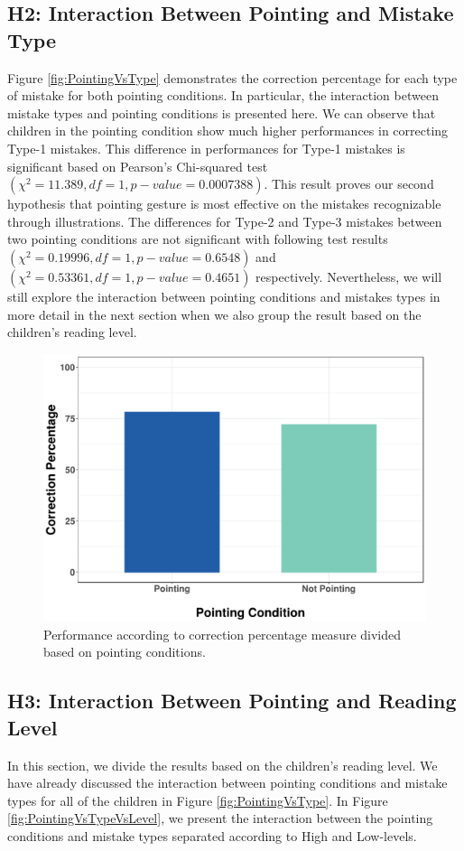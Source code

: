 \documentclass{sigchi}
\begin{document}
\subsection{H2: Interaction Between Pointing and Mistake Type}
Figure \ref{fig:PointingVsType} demonstrates the correction percentage for each type of mistake for both pointing conditions. 
In particular, the interaction between mistake types and pointing conditions is presented here. 
We can observe that children in the pointing condition show much higher performances in correcting Type-1 mistakes.
This difference in performances for Type-1 mistakes is significant based on Pearson's Chi-squared test $(\chi^2 = 11.389, df = 1, p-value = 0.0007388)$.
This result proves our second hypothesis that pointing gesture is most effective on the mistakes recognizable through illustrations.
The differences for Type-2 and Type-3 mistakes between two pointing conditions are not significant with following test results $(\chi^2 = 0.19996, df = 1, p-value = 0.6548)$ and $(\chi^2 = 0.53361, df = 1, p-value = 0.4651)$ respectively.
Nevertheless, we will still explore the interaction between pointing conditions and mistakes types in more detail in the next section when we also group the result based on the children's reading level.
\begin{figure}[t]
  \centering
  \includegraphics[width=1\linewidth]{figures/cVp.pdf}
  \caption{Performance according to correction percentage measure divided based on pointing conditions.}
  \label{fig:Pointing}
\end{figure}

\subsection{H3: Interaction Between Pointing and Reading Level}
In this section, we divide the results based on the children's reading level.
We have already discussed the interaction between pointing conditions and mistake types for all of the children in Figure \ref{fig:PointingVsType}.
In Figure \ref{fig:PointingVsTypeVsLevel}, we present the interaction between the pointing conditions and mistake types separated according to High and Low-levels. 
\end{document}

